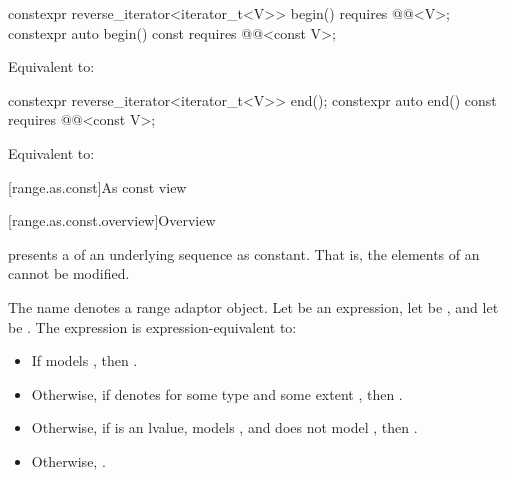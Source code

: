 %
\begin{itemdecl}
constexpr reverse_iterator<iterator_t<V>> begin() requires @@<V>;
constexpr auto begin() const requires @@<const V>;
\end{itemdecl}

\begin{itemdescr}
\pnum
\effects
Equivalent to: 
\end{itemdescr}

%
\begin{itemdecl}
constexpr reverse_iterator<iterator_t<V>> end();
constexpr auto end() const requires @@<const V>;
\end{itemdecl}

\begin{itemdescr}
\pnum
\effects
Equivalent to: 
\end{itemdescr}

[range.as.const]{As const view}

[range.as.const.overview]{Overview}

\pnum
{} presents a  of an underlying sequence as constant.
That is, the elements of an  cannot be modified.

\pnum
The name  denotes
a range adaptor object.
Let  be an expression,
let  be , and
let  be .
The expression  is expression-equivalent to:
\begin{itemize}
\item
If  models ,
then .
\item
Otherwise,
if  denotes 
for some type  and some extent ,
then .
\item
Otherwise,
if  is an lvalue,
 models , and
 does not model ,
then .
\item
Otherwise, .
\end{itemize}

